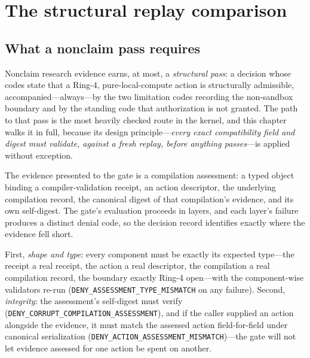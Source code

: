 \section{The structural replay comparison}\label{ch09:replay}

\subsection{What a nonclaim pass requires}\label{ch09:pass-requirements}

Nonclaim research evidence earns, at most, a \emph{structural pass}: a decision whose codes state that a Ring-4, pure-local-compute action is structurally admissible, accompanied---always---by the two limitation codes recording the non-sandbox boundary and by the standing code that authorization is not granted. The path to that pass is the most heavily checked route in the kernel, and this chapter walks it in full, because its design principle---\emph{every exact compatibility field and digest must validate, against a fresh replay, before anything passes}---is applied without exception.

The evidence presented to the gate is a compilation assessment: a typed object binding a compiler-validation receipt, an action descriptor, the underlying compilation record, the canonical digest of that compilation's evidence, and its own self-digest. The gate's evaluation proceeds in layers, and each layer's failure produces a distinct denial code, so the decision record identifies exactly where the evidence fell short.

First, \emph{shape and type}: every component must be exactly its expected type---the receipt a real receipt, the action a real descriptor, the compilation a real compilation record, the boundary exactly Ring-4 open---with the component-wise validators re-run (\texttt{DENY\_ASSESSMENT\_TYPE\_MISMATCH} on any failure). Second, \emph{integrity}: the assessment's self-digest must verify (\texttt{DENY\_CORRUPT\_COMPILATION\_ASSESSMENT}), and if the caller supplied an action alongside the evidence, it must match the assessed action field-for-field under canonical serialization (\texttt{DENY\_ACTION\_ASSESSMENT\_MISMATCH})---the gate will not let evidence assessed for one action be spent on another.

